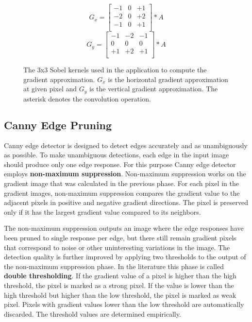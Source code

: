 \begin{figure}
    \begin{displaymath}
        G_{x} = \begin{bmatrix}
            -1 & 0 & +1 \\
            -2 & 0 & +2 \\
            -1 & 0 & +1 \\
        \end{bmatrix} \ast A
    \end{displaymath}
    \begin{displaymath}
        G_{y} = \begin{bmatrix}
            -1 & -2 & -1 \\
            0 & 0 & 0 \\
            +1 & +2 & +1 \\
        \end{bmatrix} \ast A
    \end{displaymath}
    \caption{The 3x3 Sobel kernels used in the application to compute the gradient approximation. $G_{x}$ is the horizontal gradient approximation at given pixel and $G_{y}$ is the vertical gradient approximation. The asterisk denotes the convolution operation.}
    \label{fig:sobelmat}
\end{figure}

\subsection{Canny Edge Pruning}
\label{subsec:canny-edge-pruning}
Canny edge detector is designed to detect edges accurately and as unambiguously as possible. To make unambiguous detections, each edge in the input image should produce only one edge response. For this purpose Canny edge detector employs \textbf{non-maximum suppression}. Non-maximum suppression works on the gradient image that was calculated in the previous phase. For each pixel in the gradient images, non-maximum suppression compares the gradient value to the adjacent pixels in positive and negative gradient directions. The pixel is preserved only if it has the largest gradient value compared to its neighbors.~\cite{gonzalez2008digital}

The non-maximum suppression outputs an image where the edge responses have been pruned to single response per edge, but there still remain gradient pixels that correspond to noise or other uninteresting variations in the image. The detection quality is further improved by applying two thresholds to the output of the non-maximum suppression phase. In the literature this phase is called \textbf{double thresholding}. If the gradient value of a pixel is higher than the high threshold, the pixel is marked as a strong pixel. If the value is lower than the high threshold but higher than the low threshold, the pixel is marked as weak pixel. Pixels with gradient values lower than the low threshold are automatically discarded. The threshold values are determined empirically.~\cite{gonzalez2008digital}

